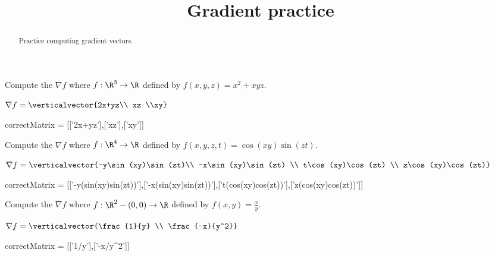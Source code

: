 \documentclass{ximera}
\title{Gradient practice}
\begin{document}
	\begin{abstract}
		Practice computing gradient vectors.
	\end{abstract}
	
	\begin{question}	
		Compute the $\nabla f$ where $f:\R^3 \to \R$ defined by $f(x,y,z) = x^2+xyz$.
		\begin{solution}
		\begin{hint}
			\(\nabla f = \verticalvector{2x+yz\\ xz \\xy}\)
		\end{hint}
		\begin{matrix-answer}[name=J]
			correctMatrix  = [['2x+yz'],['xz'],['xy']]
		\end{matrix-answer}
		\end{solution}
	\end{question}
	
	\begin{question}	
		Compute the $\nabla f$ where $f:\R^4 \to \R$ defined by $f(x,y,z,t) = \cos(xy)\sin(zt)$.
		\begin{solution}
		\begin{hint}
			\(\nabla f = \verticalvector{-y\sin(xy)\sin(zt)\\ -x\sin(xy)\sin(zt) \\ t\cos(xy)\cos(zt) \\ z\cos(xy)\cos(zt)}\)
		\end{hint}
		\begin{matrix-answer}[name=J]
			correctMatrix  = [['-y(sin(xy)sin(zt))'],['-x(sin(xy)sin(zt))'],['t(cos(xy)cos(zt))'],['z(cos(xy)cos(zt))']]
		\end{matrix-answer}
		\end{solution}
	\end{question}
	
	\begin{question}	
		Compute the $\nabla f$ where $f:\R^2-{(0,0)} \to \R$ defined by $f(x,y) = \frac{x}{y}$.
		\begin{solution}
		\begin{hint}
			\(\nabla f = \verticalvector{\frac{1}{y} \\ \frac{-x}{y^2}}\)
		\end{hint}
		\begin{matrix-answer}[name=J]
			correctMatrix  = [['1/y'],['-x/y^2']]
		\end{matrix-answer}
		\end{solution}
	\end{question}

	
\end{document}
